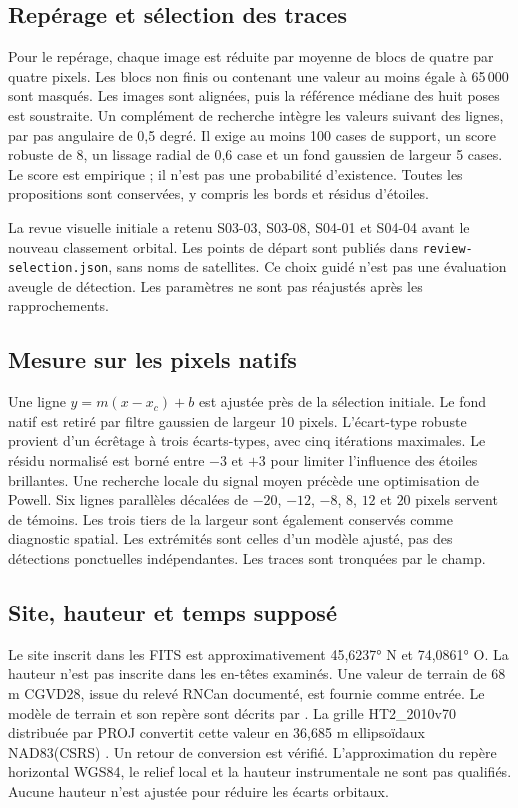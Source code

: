 \documentclass[11pt,letterpaper]{article}
\begin{document}
\subsection{Repérage et sélection des traces}
Pour le repérage, chaque image est réduite par moyenne de blocs de quatre par quatre pixels.
Les blocs non finis ou contenant une valeur au moins égale à 65\,000 sont masqués.
Les images sont alignées, puis la référence médiane des huit poses est soustraite.
Un complément de recherche intègre les valeurs suivant des lignes, par pas angulaire de 0,5 degré.
Il exige au moins 100 cases de support, un score robuste de 8, un lissage radial de 0,6 case et un fond gaussien de largeur 5 cases.
Le score est empirique ; il n’est pas une probabilité d’existence.
Toutes les propositions sont conservées, y compris les bords et résidus d’étoiles.

La revue visuelle initiale a retenu S03-03, S03-08, S04-01 et S04-04 avant le nouveau classement orbital.
Les points de départ sont publiés dans \texttt{review-selection.json}, sans noms de satellites.
Ce choix guidé n’est pas une évaluation aveugle de détection.
Les paramètres ne sont pas réajustés après les rapprochements.

\subsection{Mesure sur les pixels natifs}
Une ligne $y=m(x-x_c)+b$ est ajustée près de la sélection initiale.
Le fond natif est retiré par filtre gaussien de largeur 10 pixels.
L’écart-type robuste provient d’un écrêtage à trois écarts-types, avec cinq itérations maximales.
Le résidu normalisé est borné entre $-3$ et $+3$ pour limiter l’influence des étoiles brillantes.
Une recherche locale du signal moyen précède une optimisation de Powell.
Six lignes parallèles décalées de $-20$, $-12$, $-8$, $8$, $12$ et $20$ pixels servent de témoins.
Les trois tiers de la largeur sont également conservés comme diagnostic spatial.
Les extrémités sont celles d’un modèle ajusté, pas des détections ponctuelles indépendantes.
Les traces sont tronquées par le champ.

\subsection{Site, hauteur et temps supposé}
Le site inscrit dans les FITS est approximativement 45,6237° N et 74,0861° O.
La hauteur n’est pas inscrite dans les en-têtes examinés.
Une valeur de terrain de 68 m CGVD28, issue du relevé RNCan documenté, est fournie comme entrée.
Le modèle de terrain et son repère sont décrits par \textcite{cdem}.
La grille HT2\_2010v70 distribuée par PROJ convertit cette valeur en 36,685 m ellipsoïdaux NAD83(CSRS) \parencite{proj}.
Un retour de conversion est vérifié.
L’approximation du repère horizontal WGS84, le relief local et la hauteur instrumentale ne sont pas qualifiés.
Aucune hauteur n’est ajustée pour réduire les écarts orbitaux.
\end{document}
